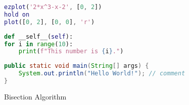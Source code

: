 \begin{lstlisting}[language = Matlab, title = {Answer.m}]
% Plot function f(x) = 2*x^3 - x - 2
ezplot('2*x^3-x-2', [0, 2])
hold on
plot([0, 2], [0, 0], 'r')
\end{lstlisting}

\begin{lstlisting}[language = Python]
def __self__(self):
for i in range(10):
	print(f"This number is {i}.")
\end{lstlisting}

\begin{lstlisting}[language = java]
public static void main(String[] args) {
	System.out.println("Hello World!"); // comment
}
\end{lstlisting}

\begin{algorithm}
\caption{Bisection Algorithm}
\DontPrintSemicolon
{}
\BlankLine
{}
\end{algorithm}
